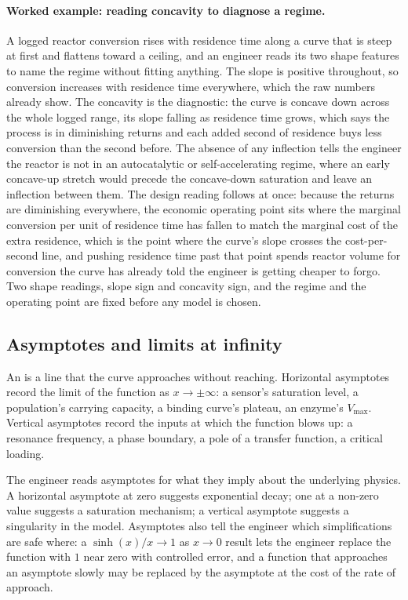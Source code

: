 \paragraph{Worked example: reading concavity to diagnose a regime.}
A logged reactor conversion rises with residence time along a curve that
is steep at first and flattens toward a ceiling, and an engineer reads
its two shape features to name the regime without fitting anything. The
slope is positive throughout, so conversion increases with residence
time everywhere, which the raw numbers already show. The concavity is
the diagnostic: the curve is concave down across the whole logged range,
its slope falling as residence time grows, which says the process is in
diminishing returns and each added second of residence buys less
conversion than the second before. The absence of any inflection tells
the engineer the reactor is not in an autocatalytic or self-accelerating
regime, where an early concave-up stretch would precede the concave-down
saturation and leave an inflection between them. The design reading
follows at once: because the returns are diminishing everywhere, the
economic operating point sits where the marginal conversion per unit of
residence time has fallen to match the marginal cost of the extra
residence, which is the point where the curve's slope crosses the
cost-per-second line, and pushing residence time past that point spends
reactor volume for conversion the curve has already told the engineer is
getting cheaper to forgo. Two shape readings, slope sign and concavity
sign, and the regime and the operating point are fixed before any model
is chosen.

\subsection{Asymptotes and limits at infinity}

An  is a line that the curve approaches without
reaching. Horizontal asymptotes record the limit of the function as
$x \to \pm \infty$: a sensor's saturation level, a population's
carrying capacity, a binding curve's plateau, an enzyme's
$V_{\max}$. Vertical asymptotes record the inputs at which the
function blows up: a resonance frequency, a phase boundary, a pole
of a transfer function, a critical loading.

The engineer reads asymptotes for what they imply about the
underlying physics. A horizontal asymptote at zero suggests
exponential decay; one at a non-zero value suggests a saturation
mechanism; a vertical asymptote suggests a singularity in the model.
Asymptotes also tell the engineer which simplifications are safe
where: a $\sinh(x)/x \to 1$ as $x \to 0$ result lets the engineer
replace the function with $1$ near zero with controlled error, and a
function that approaches an asymptote slowly may be replaced by the
asymptote at the cost of the rate of approach.

